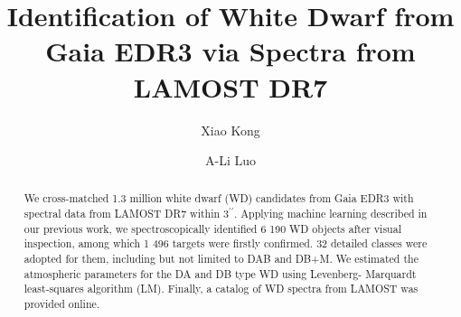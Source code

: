 \documentclass{aastex631}
\begin{document}
\title{Identification of White Dwarf from Gaia EDR3 via Spectra from LAMOST DR7}


\author[0000-0001-8011-8401]{Xiao Kong}

\author[0000-0001-7865-2648]{A-Li Luo}



\begin{abstract}

We cross-matched 1.3 million white dwarf (WD) candidates from Gaia EDR3 with spectral data from LAMOST DR7 within $3^{\prime\prime}$. Applying machine learning described in our previous work, we spectroscopically identified 6 190 WD objects after visual inspection, among which 1 496 targets were firstly confirmed. 32 detailed classes were adopted for them, including but not limited to DAB and DB+M. We estimated the atmospheric parameters for the DA and DB type WD using Levenberg- Marquardt least-squares algorithm (LM). Finally, a catalog of WD spectra from LAMOST was provided online.


\end{abstract}

\end{document}
